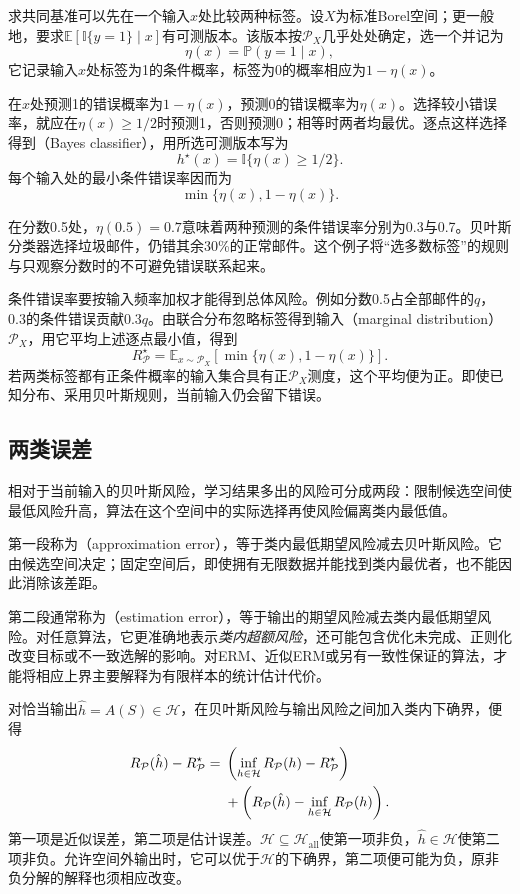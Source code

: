 求共同基准可以先在一个输入$x$处比较两种标签。设$X$为标准Borel空间；更一般地，要求$\mathbb E[\mathbb I\{y=1\}\mid x]$有可测版本。该版本按$\mathcal P_X$几乎处处确定，选一个并记为
\[
 \eta(x)=\mathbb P(y=1\mid x),
\]
它记录输入$x$处标签为1的条件概率，标签为0的概率相应为$1-\eta(x)$。

在$x$处预测1的错误概率为$1-\eta(x)$，预测0的错误概率为$\eta(x)$。选择较小错误率，就应在$\eta(x)\geq1/2$时预测1，否则预测0；相等时两者均最优。逐点这样选择得到（Bayes classifier），用所选可测版本写为
\[
 h^\star(x)=\mathbb I\{\eta(x)\geq1/2\}.
\]
每个输入处的最小条件错误率因而为
\[
 \min\{\eta(x),1-\eta(x)\}.
\]

在分数0.5处，$\eta(0.5)=0.7$意味着两种预测的条件错误率分别为0.3与0.7。贝叶斯分类器选择垃圾邮件，仍错其余30\%的正常邮件。这个例子将“选多数标签”的规则与只观察分数时的不可避免错误联系起来。

条件错误率要按输入频率加权才能得到总体风险。例如分数0.5占全部邮件的$q$，0.3的条件错误贡献$0.3q$。由联合分布忽略标签得到输入（marginal distribution）$\mathcal P_X$，用它平均上述逐点最小值，得到
\[
 R_{\mathcal P}^\star=
 \mathbb E_{x\sim\mathcal P_X}[\min\{\eta(x),1-\eta(x)\}].
\]
若两类标签都有正条件概率的输入集合具有正$\mathcal P_X$测度，这个平均便为正。即使已知分布、采用贝叶斯规则，当前输入仍会留下错误。

\subsection{两类误差}

相对于当前输入的贝叶斯风险，学习结果多出的风险可分成两段：限制候选空间使最低风险升高，算法在这个空间中的实际选择再使风险偏离类内最低值。

第一段称为（approximation error），等于类内最低期望风险减去贝叶斯风险。它由候选空间决定；固定空间后，即使拥有无限数据并能找到类内最优者，也不能因此消除该差距。

第二段通常称为（estimation error），等于输出的期望风险减去类内最低期望风险。对任意算法，它更准确地表示\emph{类内超额风险}，还可能包含优化未完成、正则化改变目标或不一致选解的影响。对ERM、近似ERM或另有一致性保证的算法，才能将相应上界主要解释为有限样本的统计估计代价。

对恰当输出$\hat h=A(S)\in\mathcal H$，在贝叶斯风险与输出风险之间加入类内下确界，便得
\begin{align}
 R_{\mathcal P}(\hat h)-R_{\mathcal P}^\star
 ={}&\left(\inf_{h\in\mathcal H}R_{\mathcal P}(h)-R_{\mathcal P}^\star\right)
 \label{eq:approximation-estimation-decomposition}\\
 &+\left(R_{\mathcal P}(\hat h)-\inf_{h\in\mathcal H}R_{\mathcal P}(h)\right).
 \notag
\end{align}
第一项是近似误差，第二项是估计误差。$\mathcal H\subseteq\mathcal H_{\mathrm{all}}$使第一项非负，$\hat h\in\mathcal H$使第二项非负。允许空间外输出时，它可以优于$\mathcal H$的下确界，第二项便可能为负，原非负分解的解释也须相应改变。

